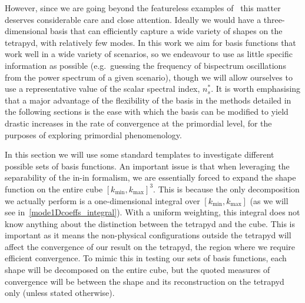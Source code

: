 \documentclass[a4paper,12pt]{extarticle}
\newcommand{\kmin}{{k_\text{min}}}
\newcommand{\kmax}{{k_\text{max}}}
\begin{document}
However, since we are going beyond the featureless examples of~\cite{Funakoshi}
this matter deserves considerable care and close attention.
Ideally we would have a three-dimensional basis that can efficiently
capture a wide variety of shapes on the tetrapyd, with relatively few modes.
In this work we aim for basis functions that work well in a wide variety of scenarios,
so we endeavour to use as little specific information as possible
(e.g.\ guessing the frequency of bispectrum oscillations from
the power spectrum of a given scenario), though we
will allow ourselves to use a representative value
of the scalar spectral index, $n_s^{*}$.   It is worth emphasising that a major advantage of the flexibility of the basis
in the methods detailed in the following sections is the ease with which
the basis can be modified to yield drastic increases in 
the rate of convergence at the primordial level, for the purposes of
exploring primordial phenomenology.


In this section we will use some standard templates to investigate different possible sets of basis functions.
An important issue is that when leveraging the separability of the in-in formalism,
we are essentially forced to expand the shape function on the entire cube ${[\kmin,\kmax]}^3$.
This is because the only decomposition we actually perform is
a one-dimensional integral over $[\kmin,\kmax]$
(as we will see in~\eqref{mode1Dcoeffs_integral}).
With a uniform weighting, this integral does not know anything about the 
distinction between the tetrapyd and the cube.
This is important as it means the non-physical configurations outside the tetrapyd will affect the convergence of our result on the tetrapyd, the region where we require efficient convergence.
To mimic this in testing our sets of basis functions, each shape will be decomposed on the
entire cube, but the quoted measures of convergence will be between the shape
and its reconstruction on the tetrapyd only (unless stated otherwise).
\end{document}
